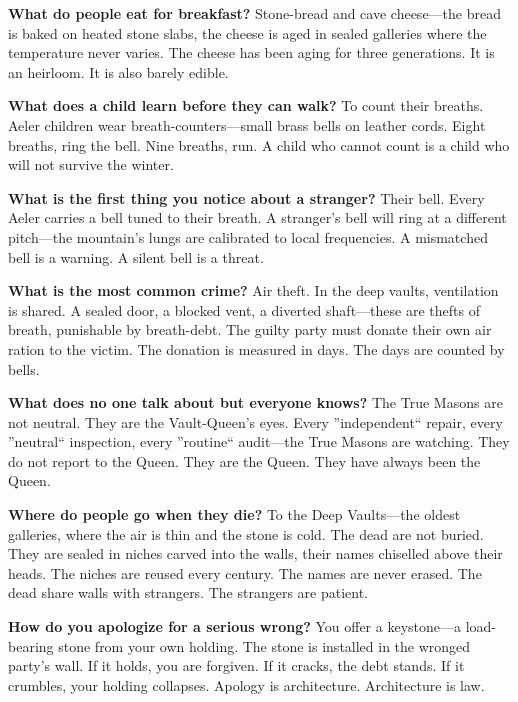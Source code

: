 \vspace{1em}

\begin{almanac}
\textbf{What do people eat for breakfast?} Stone-bread and cave cheese---the bread is baked on heated stone slabs, the cheese is aged in sealed galleries where the temperature never varies. The cheese has been aging for three generations. It is an heirloom. It is also barely edible.

\textbf{What does a child learn before they can walk?} To count their breaths. Aeler children wear breath-counters---small brass bells on leather cords. Eight breaths, ring the bell. Nine breaths, run. A child who cannot count is a child who will not survive the winter.

\textbf{What is the first thing you notice about a stranger?} Their bell. Every Aeler carries a bell tuned to their breath. A stranger's bell will ring at a different pitch---the mountain's lungs are calibrated to local frequencies. A mismatched bell is a warning. A silent bell is a threat.

\textbf{What is the most common crime?} Air theft. In the deep vaults, ventilation is shared. A sealed door, a blocked vent, a diverted shaft---these are thefts of breath, punishable by breath-debt. The guilty party must donate their own air ration to the victim. The donation is measured in days. The days are counted by bells.

\textbf{What does no one talk about but everyone knows?} The True Masons are not neutral. They are the Vault-Queen's eyes. Every ''independent`` repair, every ''neutral`` inspection, every ''routine`` audit---the True Masons are watching. They do not report to the Queen. They are the Queen. They have always been the Queen.

\textbf{Where do people go when they die?} To the Deep Vaults---the oldest galleries, where the air is thin and the stone is cold. The dead are not buried. They are sealed in niches carved into the walls, their names chiselled above their heads. The niches are reused every century. The names are never erased. The dead share walls with strangers. The strangers are patient.

\textbf{How do you apologize for a serious wrong?} You offer a keystone---a load-bearing stone from your own holding. The stone is installed in the wronged party's wall. If it holds, you are forgiven. If it cracks, the debt stands. If it crumbles, your holding collapses. Apology is architecture. Architecture is law.


\end{almanac}
